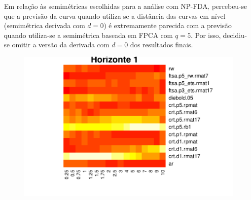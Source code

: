 \documentclass[
	12pt,				%
	openright,			%
	oneside,			%
	a4paper,			%
	english,			%
	brazil				%
	]{dissertacao-ufrgs-abntex2}
\begin{document}
Em relação às semimétricas escolhidas para a análise com NP-FDA, percebeu-se que a previsão da curva quando utiliza-se a distância das curvas em nível (semimétrica derivada com $d=0$) é extremamente parecida com a previsão quando utiliza-se a semimétrica baseada em FPCA com $q=5$. Por isso, decidiu-se omitir a versão da derivada com $d=0$ dos resultados finais.

\begin{figure}[htp]
  \centering
  \begin{minipage}[t]{0.45\linewidth}
    \centering
    \begin{minipage}[t]{\linewidth}
      \centering     \includegraphics[width=\textwidth]{anexos/heatmap1.pdf}
     

\end{minipage}
\end{minipage}
\end{figure}
\end{document}
